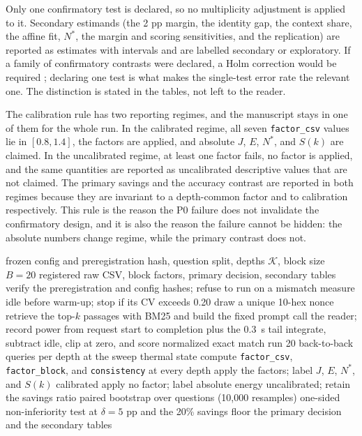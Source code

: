 \documentclass[a4paper,fleqn]{cas-sc}
\begin{document}
Only one confirmatory test is declared, so no multiplicity adjustment is applied to it. Secondary estimands (the 2 pp margin, the identity gap, the context share, the affine fit, $N^{*}$, the margin and scoring sensitivities, and the replication) are reported as estimates with intervals and are labelled secondary or exploratory. If a family of confirmatory contrasts were declared, a Holm correction would be required \cite{holm1979}; declaring one test is what makes the single-test error rate the relevant one. The distinction is stated in the tables, not left to the reader.

The calibration rule has two reporting regimes, and the manuscript stays in one of them for the whole run. In the calibrated regime, all seven \texttt{factor\_csv} values lie in $[0.8,1.4]$, the factors are applied, and absolute $J$, $E$, $N^{*}$, and $S(k)$ are claimed. In the uncalibrated regime, at least one factor fails, no factor is applied, and the same quantities are reported as uncalibrated descriptive values that are not claimed. The primary savings and the accuracy contrast are reported in both regimes because they are invariant to a depth-common factor and to calibration respectively. This rule is the reason the P0 failure does not invalidate the confirmatory design, and it is also the reason the failure cannot be hidden: the absolute numbers change regime, while the primary contrast does not.

\begin{algorithm}[H]
  \caption{Preregistered depth sweep, calibration, and primary analysis}
  \label{alg:run}
  \begin{algorithmic}[1]
    \Require frozen config and preregistration hash, question split, depths $\mathcal{K}$, block size $B=20$
    \Ensure registered raw CSV, block factors, primary decision, secondary tables
    \State verify the preregistration and config hashes; refuse to run on a mismatch
    \State measure idle before warm-up; stop if its CV exceeds 0.20
      \State draw a unique 10-hex nonce
        \State retrieve the top-$k$ passages with BM25 and build the fixed prompt
        \State call the reader; record power from request start to completion plus the 0.3~s tail
        \State integrate, subtract idle, clip at zero, and score normalized exact match
      \EndFor
    \EndFor
    \State run 20 back-to-back queries per depth at the sweep thermal state
    \State compute \texttt{factor\_csv}, \texttt{factor\_block}, and \texttt{consistency} at every depth
      \State apply the factors; label $J$, $E$, $N^{*}$, and $S(k)$ calibrated
    \Else
      \State apply no factor; label absolute energy uncalibrated; retain the savings ratio
    \EndIf
    \State paired bootstrap over questions (10{,}000 resamples)
    \State one-sided non-inferiority test at $\delta=5$ pp and the 20\% savings floor
    \State \Return the primary decision and the secondary tables
  \end{algorithmic}
\end{algorithm}
\end{document}
